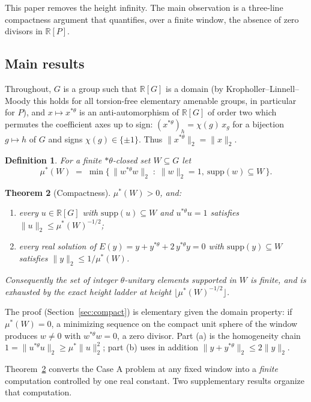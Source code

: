 \documentclass[10pt,a4paper]{amsart}
\newtheorem{theorem}{Theorem}[section]
\newtheorem{definition}[theorem]{Definition}
\newcommand{\RR}{\mathbb{R}}
\newcommand{\thst}{{*\theta}}
\newcommand{\supp}{\mathrm{supp}}
\begin{document}
This paper removes the height infinity.  The main observation is a
three-line compactness argument that quantifies, over a finite window,
the absence of zero divisors in $\RR[P]$.

\subsection*{Main results}

Throughout, $G$ is a group such that $\RR[G]$ is a domain (by
Kropholler--Linnell--Moody \cite{KLM} this holds for all torsion-free
elementary amenable groups, in particular for $P$), and
$x\mapsto x^{\thst}$ is an anti-automorphism of $\RR[G]$ of order two
which permutes the coefficient axes up to sign: $(x^{\thst})_h =
\chi(g)\,x_g$ for a bijection $g\mapsto h$ of $G$ and signs
$\chi(g)\in\{\pm1\}$.  Thus $\|x^{\thst}\|_2=\|x\|_2$.

\begin{definition}
For a finite $\thst$-closed set $W\subseteq G$ let
\[
\mu^*(W)\;=\;\min\bigl\{\,\|w^{\thst}w\|_2\;:\;\|w\|_2=1,\
\supp(w)\subseteq W\,\bigr\}.
\]
\end{definition}


\begin{theorem}[Compactness]\label{thm:compact}
$\mu^*(W)>0$, and:
\begin{enumerate}
\item[(a)] every $u\in\RR[G]$ with $\supp(u)\subseteq W$ and
$u^{\thst}u=1$ satisfies $\|u\|_2\le \mu^*(W)^{-1/2}$;
\item[(b)] every real solution of
$E(y)=y+y^{\thst}+2\,y^{\thst}y=0$ with $\supp(y)\subseteq W$
satisfies $\|y\|_2\le 1/\mu^*(W)$.
\end{enumerate}
Consequently the set of \emph{integer} $\theta$-unitary elements
supported in $W$ is finite, and is exhausted by the exact height
ladder at height $\lfloor\mu^*(W)^{-1/2}\rfloor$.
\end{theorem}


The proof (Section~\ref{sec:compact}) is elementary given the domain
property: if $\mu^*(W)=0$, a minimizing sequence on the compact unit
sphere of the window produces $w\ne 0$ with $w^{\thst}w=0$, a zero
divisor.  Part (a) is the homogeneity chain
$1=\|u^{\thst}u\|_2\ge\mu^*\|u\|_2^2$; part (b) uses in addition
$\|y+y^{\thst}\|_2\le 2\|y\|_2$.

Theorem~\ref{thm:compact} converts the Case A problem at any fixed
window into a \emph{finite} computation controlled by one real
constant.  Two supplementary results organize that computation.
\end{document}
